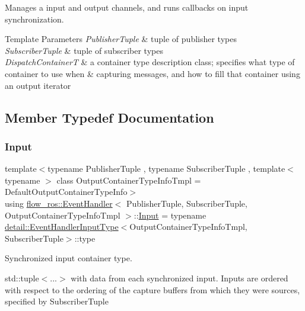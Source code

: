Manages a input and output channels, and runs callbacks on input synchronization. 


\begin{DoxyTemplParams}{Template Parameters}
{\em Publisher\+Tuple} & tuple of publisher types \\
\hline
{\em Subscriber\+Tuple} & tuple of subscriber types \\
\hline
{\em Dispatch\+ContainerT} & a container type description class; specifies what type of container to use when \& capturing messages, and how to fill that container using an output iterator \\
\hline
\end{DoxyTemplParams}


\subsection{Member Typedef Documentation}
\mbox{\label{classflow__ros_1_1_event_handler_a53af7756aaf98646281d57b036510d56}} 
\subsubsection{\texorpdfstring{Input}{Input}}
{\footnotesize\ttfamily template$<$typename Publisher\+Tuple , typename Subscriber\+Tuple , template$<$ typename $>$ class Output\+Container\+Type\+Info\+Tmpl = Default\+Output\+Container\+Type\+Info$>$ \\
using \hyperlink{classflow__ros_1_1_event_handler}{flow\+\_\+ros\+::\+Event\+Handler}$<$ Publisher\+Tuple, Subscriber\+Tuple, Output\+Container\+Type\+Info\+Tmpl $>$\+::\hyperlink{classflow__ros_1_1_event_handler_a53af7756aaf98646281d57b036510d56}{Input} =  typename \hyperlink{structflow__ros_1_1detail_1_1_event_handler_input_type}{detail\+::\+Event\+Handler\+Input\+Type}$<$Output\+Container\+Type\+Info\+Tmpl, Subscriber\+Tuple$>$\+::type}



Synchronized input container type. 

{\ttfamily std\+::tuple$<$...$>$} with data from each synchronized input. Inputs are ordered with respect to the ordering of the capture buffers from which they were sources, specified by {\ttfamily Subscriber\+Tuple} \mbox{\label{classflow__ros_1_1_event_handler_ae5dc263e5c12a4b7fb60f320dc403173}} 
